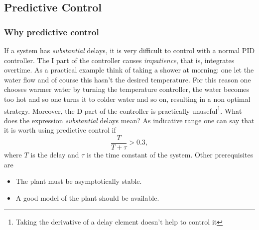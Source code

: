 \documentclass[a4paper,12 pt]{article}
\numberwithin{equation}{section}
\theoremstyle{definition}
\theoremstyle{remark}
\theoremstyle{definition}
\theoremstyle{definition}
\theoremstyle{definition}
\theoremstyle{remark}
\begin{document}
\newpage


\subsection{Predictive Control}
\subsubsection{Why predictive control}
If a system has \textit{substantial} delays, it is very difficult to control with a normal PID controller. The I part of the controller causes \textit{impatience}, that is, integrates overtime. As a practical example think of taking a shower at morning: one let the water flow and of course this hasn't the desired temperature. For this reason one chooses warmer water by turning the temperature controller, the water becomes too hot and so one turns it to colder water and so on, resulting in a non optimal strategy. Moreover, the D part of the controller is practically unuseful\footnote{Taking the derivative of a delay element doesn't help to control it}.
What does the expression \textit{substantial} delays mean? As indicative range one can say that it is worth using predictive control if
\begin{equation}
\frac{T}{T+\tau}>0.3,
\end{equation}
where $T$ is the delay and $\tau$ is the time constant of the system. Other prerequisites are
\begin{itemize}
\item The plant must be asymptotically stable.
\item A good model of the plant should be available.
\end{itemize}
\end{document}
